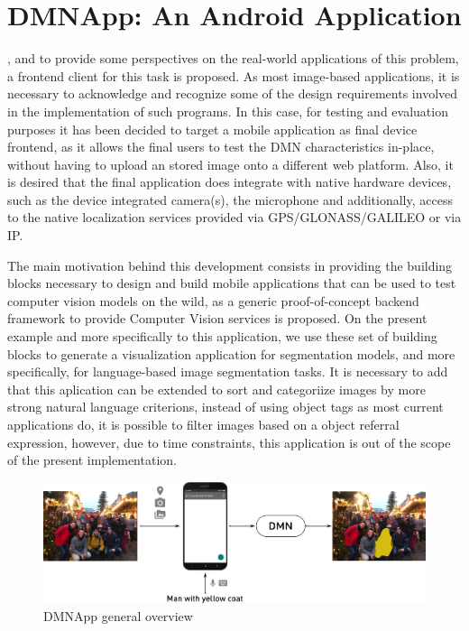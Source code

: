 
\chapter{DMNApp: An Android Application}

, and to provide some perspectives on the real-world applications of this problem, a frontend client for this task is proposed. As most image-based applications, it is necessary to acknowledge and recognize some of the design requirements involved in the implementation of such programs. In this case, for testing and evaluation purposes it has been decided to target a mobile application as final device frontend, as it allows the final users to test the DMN characteristics in-place, without having to upload an stored image onto a different web platform. Also, it is desired that the final application does integrate with native hardware devices, such as the device integrated camera(s), the microphone and additionally, access to the native localization services provided via GPS/GLONASS/GALILEO or via IP.

The main motivation behind this development consists in providing the building blocks necessary to design and build mobile applications that can be used to test computer vision models on the wild, as a generic proof-of-concept backend framework to provide Computer Vision services is proposed. On the present example and more specifically to this application, we use these set of building blocks to generate a visualization application for segmentation models, and more specifically, for language-based image segmentation tasks. It is necessary to add that this aplication can be extended to sort and categoriize images by more strong natural language criterions, instead of using object tags as most current applications do, it is possible to filter images based on a object referral expression, however, due to time constraints, this application is out of the scope of the present implementation.

\begin{figure}[!htbp]
    \centering
    \includegraphics[width=\textwidth]{./figures/dmn_app/App_Overview.pdf}
    \caption{DMNApp general overview}
    \label{Fig:App_Overview}
\end{figure}

